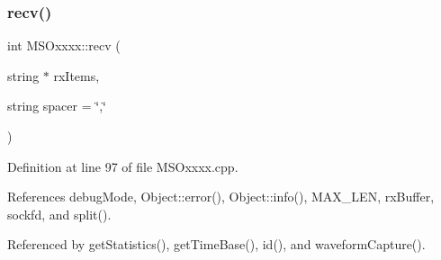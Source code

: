 \mbox{\label{classMSOxxxx_aa02e46a61e287ef1f5377e9e42399faf}} 
\subsubsection{\texorpdfstring{recv()}{recv()}}
{\footnotesize\ttfamily int M\+S\+Oxxxx\+::recv (\begin{DoxyParamCaption}\item[{string $\ast$}]{rx\+Items,  }\item[{string}]{spacer = {\ttfamily \char`\"{},\char`\"{}} }\end{DoxyParamCaption})\hspace{0.3cm}{\ttfamily [private]}}



Definition at line 97 of file M\+S\+Oxxxx.\+cpp.



References debug\+Mode, Object\+::error(), Object\+::info(), M\+A\+X\+\_\+\+L\+EN, rx\+Buffer, sockfd, and split().



Referenced by get\+Statistics(), get\+Time\+Base(), id(), and waveform\+Capture().


